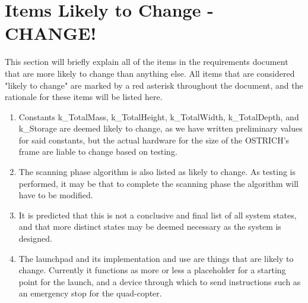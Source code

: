 \documentclass[10pt,letterpaper]{article}
\begin{document}
\newpage


\section{Items Likely to Change - CHANGE!}
This section will briefly explain all of the items in the requirements document that are more likely to change than anything else. All items that are considered "likely to change" are marked by a red asterisk throughout the document, and the rationale for these items will be listed here.\par

\begin{enumerate}
	\item Constants k\_TotalMass, k\_TotalHeight, k\_TotalWidth, k\_TotalDepth, and k\_Storage are deemed likely to change, as we have written preliminary values for said constants, but the actual hardware for the size of the OSTRICH's frame are liable to change based on testing.
    \item The scanning phase algorithm is also listed as likely to change. As testing is performed, it may be that to complete the scanning phase the algorithm will have to be modified.
    \item It is predicted that this is not a conclusive and final list of all system states, and that more distinct states may be deemed necessary as the system is designed.
    \item The launchpad and its implementation and use are things that are likely to change. Currently it functions as more or less a placeholder for a starting point for the launch, and a device through which to send instructions such as an emergency stop for the quad-copter.
\end {enumerate}
\end{document}
